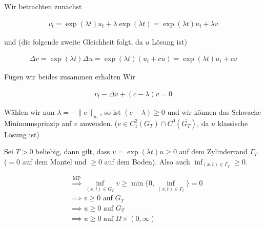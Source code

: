 \begin{solution}

Wir betrachten zunächst

\begin{align*}
  v_{t} = \exp (\lambda t) u_t + \lambda \exp(\lambda t) = \exp (\lambda t) u_t + \lambda v
\end{align*}

und (die folgende zweite Gleichheit folgt, da $u$ Lösung ist)

\begin{align*}
  \Delta v = \exp (\lambda t) \Delta u = \exp (\lambda t) (u_{t} + cu) = \exp (\lambda t) u_{t} + cv
\end{align*}

Fügen wir beides zusammen erhalten Wir

\begin{align*}
  v_{t} - \Delta v + (c-\lambda)v = 0
\end{align*}

Wählen wir nun $\lambda = - \|c\|_{\infty}$, so ist $(c-\lambda) \geq 0$ und wir können das Schwache Minimumsprinzip auf $v$ anwenden. ($v \in C_{1}^{2}(G_T) \cap C^0(\overline{G_T})$, da $u$ klassische Lösung ist)

Sei $T>0$ beliebig, dann gilt, dass $v = \exp (\lambda t) u \geq 0$ auf dem Zylinderrand $\Gamma_{T}$ ($=0$ auf dem Mantel und $\geq 0$ auf dem Boden). Also auch $\inf_{(x,t)\in \Gamma_{T}} \geq 0$.

\begin{align*}
 & \stackrel{\text{MP}}{\implies} \inf_{(x,t) \in G_{T}} v \geq \min \{0, \inf_{(x,t)\in \Gamma_{t}} \} = 0 \\
 & \implies v \geq 0 \text{~auf~} G_{T} \\
 & \implies u \geq 0 \text{~auf~} G_{T} \\
 & \implies u \geq 0 \text{~auf~} \Omega \times (0, \infty)
\end{align*}

\end{solution}

